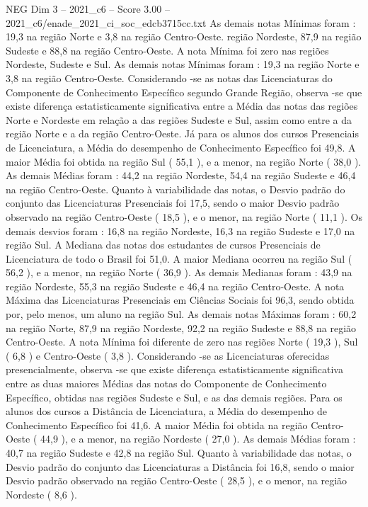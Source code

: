 \begin{textsample}{NEG Dim 3 – 2021\_c6 – Score 3.00 – 2021\_c6/enade\_2021\_ci\_soc\_edcb3715cc.txt}
As demais notas Mínimas foram : 19,3 na região Norte e 3,8 na região Centro-Oeste. região Nordeste, 87,9 na região Sudeste e 88,8 na região Centro-Oeste.
A nota Mínima foi zero nas regiões Nordeste, Sudeste e Sul.
As demais notas Mínimas foram : 19,3 na região Norte e 3,8 na região Centro-Oeste.
Considerando -se as notas das Licenciaturas do Componente de Conhecimento Específico segundo Grande Região, observa -se que existe diferença estatisticamente significativa entre a Média das notas das regiões Norte e Nordeste em relação a das regiões Sudeste e Sul, assim como entre a da região Norte e a da região Centro-Oeste.
Já para os alunos dos cursos Presenciais de Licenciatura, a Média do desempenho de Conhecimento Específico foi 49,8.
A maior Média foi obtida na região Sul ( 55,1 ), e a menor, na região Norte ( 38,0 ).
As demais Médias foram : 44,2 na região Nordeste, 54,4 na região Sudeste e 46,4 na região Centro-Oeste.
Quanto à variabilidade das notas, o Desvio padrão do conjunto das Licenciaturas Presenciais foi 17,5, sendo o maior Desvio padrão observado na região Centro-Oeste ( 18,5 ), e o menor, na região Norte ( 11,1 ).
Os demais desvios foram : 16,8 na região Nordeste, 16,3 na região Sudeste e 17,0 na região Sul.
A Mediana das notas dos estudantes de cursos Presenciais de Licenciatura de todo o Brasil foi 51,0.
A maior Mediana ocorreu na região Sul ( 56,2 ), e a menor, na região Norte ( 36,9 ).
As demais Medianas foram : 43,9 na região Nordeste, 55,3 na região Sudeste e 46,4 na região Centro-Oeste.
A nota Máxima das Licenciaturas Presenciais em Ciências Sociais foi 96,3, sendo obtida por, pelo menos, um aluno na região Sul.
As demais notas Máximas foram : 60,2 na região Norte, 87,9 na região Nordeste, 92,2 na região Sudeste e 88,8 na região Centro-Oeste.
A nota Mínima foi diferente de zero nas regiões Norte ( 19,3 ), Sul ( 6,8 ) e Centro-Oeste ( 3,8 ).
Considerando -se as Licenciaturas oferecidas presencialmente, observa -se que existe diferença estatisticamente significativa entre as duas maiores Médias das notas do Componente de Conhecimento Específico, obtidas nas regiões Sudeste e Sul, e as das demais regiões.
Para os alunos dos cursos a Distância de Licenciatura, a Média do desempenho de Conhecimento Específico foi 41,6.
A maior Média foi obtida na região Centro-Oeste ( 44,9 ), e a menor, na região Nordeste ( 27,0 ).
As demais Médias foram : 40,7 na região Sudeste e 42,8 na região Sul.
Quanto à variabilidade das notas, o Desvio padrão do conjunto das Licenciaturas a Distância foi 16,8, sendo o maior Desvio padrão observado na região Centro-Oeste ( 28,5 ), e o menor, na região Nordeste ( 8,6 ).

\end{textsample}
